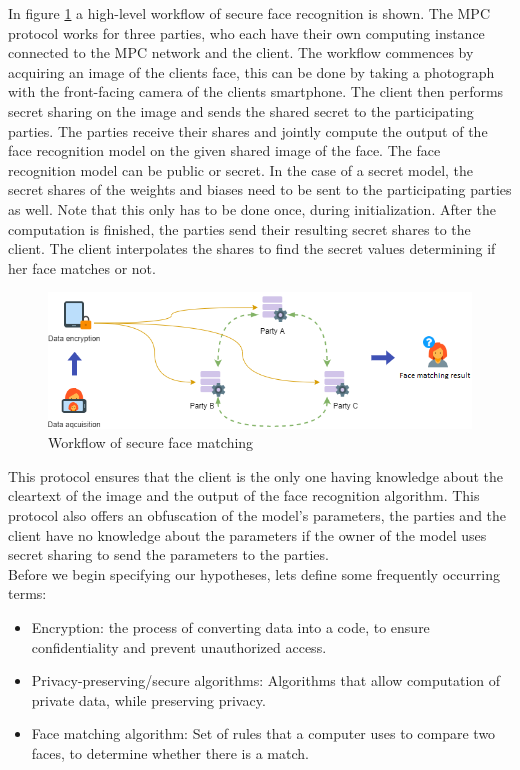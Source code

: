 In figure \ref{fig:workflow} a high-level workflow of secure face recognition is shown. The MPC protocol works for three parties, who each have their own computing instance connected to the MPC network and the client. The workflow commences by acquiring an image of the clients face, this can be done by taking a photograph with the front-facing camera of the clients smartphone. The client then performs secret sharing on the image and sends the shared secret to the participating parties. The parties receive their shares and jointly compute the output of the face recognition model on the given shared image of the face. The face recognition model can be public or secret. In the case of a secret model, the secret shares of the weights and biases need to be sent to the participating parties as well. Note that this only has to be done once, during initialization. After the computation is finished, the parties send their resulting secret shares to the client. The client interpolates the shares to find the secret values determining if her face matches or not.

\begin{figure}[H]
  \includegraphics[width=\linewidth]{fig/workflow.png}
  \caption{Workflow of secure face matching}
  \label{fig:workflow}
\end{figure}

This protocol ensures that the client is the only one having knowledge about the cleartext of the image and the output of the face recognition algorithm. This protocol also offers an obfuscation of the model's parameters, the parties and the client have no knowledge about the parameters if the owner of the model uses secret sharing to send the parameters to the parties.\\

Before we begin specifying our hypotheses, lets define some frequently occurring terms:

\begin{itemize}
  \item Encryption: the process of converting data into a code, to ensure confidentiality and prevent unauthorized access.
  \item Privacy-preserving/secure algorithms: Algorithms that allow computation of private data, while preserving privacy.
  \item Face matching algorithm: Set of rules that a computer uses to compare two faces, to determine whether there is a match.
\end{itemize}


